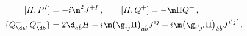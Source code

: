 \begin{equation}\label{comm}
\begin{split}
[H,P^I] &= -i\m^2J^{+I}\,,\qquad [H,Q^+]=-\m\Pi Q^+\,,\\
\{Q^-_{\da},\bar{Q}^-_{\db}\} &=
2\d_{\dot{a}\dot{b}}H-i\m\bigl(\g_{ij}\Pi\bigr)_{\dot{a}\dot{b}}J^{ij}+i\m\bigl(\g_{i'j'}\Pi\bigr)_{\dot{a}\dot{b}}J^{i'j'}\,.
\end{split}
\end{equation}

